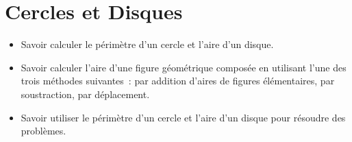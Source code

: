\chapter{Cercles et Disques}\label{ChCerclesEtDisques}

\vspace{5cm}
\begin{acquis}
\begin{itemize}
\item Savoir calculer le périmètre d'un cercle et l'aire d'un disque.
\item Savoir calculer l'aire d'une figure géométrique composée en utilisant l'une des trois méthodes suivantes : par addition d'aires de figures élémentaires, par soustraction, par déplacement.
\columnbreak
\item Savoir utiliser le périmètre d'un cercle et l'aire d'un disque pour résoudre des problèmes.
\end{itemize}
\end{acquis}


\activites


\cours


\exercicesbase
\begin{colonne*exercice}

\end{colonne*exercice}


\exercicesappr
\begin{colonne*exercice}

\end{colonne*exercice}

\connaissances


\TravauxPratiques
%

\recreation %



